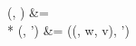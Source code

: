 \update(\delta, \varepsilon) &{}= \delta \\*
\update(\delta,  \cons \delta') &{}= \update(\setitem(\delta, w, v), \delta')
